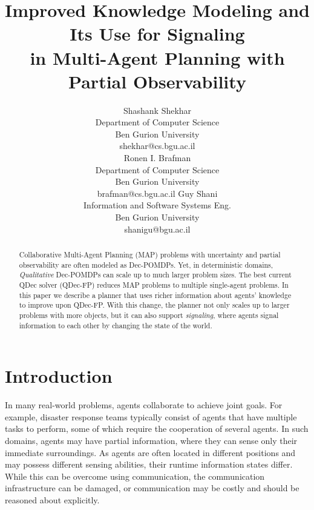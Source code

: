 \documentclass[letterpaper]{article}
\theoremstyle{definition}
\begin{document}
\title{Improved Knowledge Modeling and Its Use for Signaling\\ in Multi-Agent Planning with Partial Observability}

\author{
    Shashank Shekhar\\
    Department of Computer Science\\
    Ben Gurion University\\
    shekhar@cs.bgu.ac.il\\
    \And
    Ronen I. Brafman\\
    Department of Computer Science\\
    Ben Gurion University\\
    brafman@cs.bgu.ac.il
    \And
    Guy Shani\\
    Information and Software Systems Eng.\\
    Ben Gurion University\\
    shanigu@bgu.ac.il
}

\maketitle

\begin{abstract}
Collaborative Multi-Agent Planning (MAP)
problems with uncertainty and partial observability
are often modeled as Dec-POMDPs. Yet,
in deterministic domains, {\em Qualitative}
Dec-POMDPs can scale up to much larger problem sizes.
The best current QDec solver
(QDec-FP)
reduces MAP problems to multiple single-agent problems.
In this paper we describe a planner that uses richer information about agents' knowledge to improve upon QDec-FP.
With this change, the planner not only scales up to larger problems with more objects, but it can also support
{\em signaling}, where agents signal information to each other by changing the state of the world.
\end{abstract}

\section{Introduction}

In many real-world problems, agents collaborate to achieve joint goals. For example, disaster response teams typically consist of agents that have multiple tasks to perform,
some of which require the cooperation of several agents.
In such domains, agents may have partial information, where they can sense only their immediate surroundings.
As agents are often located in different positions and may possess different sensing abilities, their runtime information states differ.  While this can be overcome using communication, the communication infrastructure can be damaged, or communication may be costly and should be reasoned about explicitly.
\end{document}
